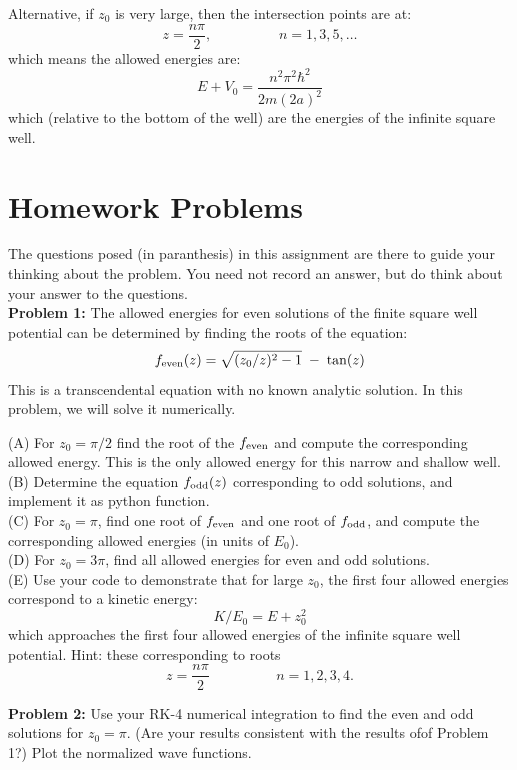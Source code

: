\documentclass[12pt]{article}
\begin{document}
Alternative, if $z_0$ is very large, then the intersection points are at:
$$z = \frac{n\pi}{2}, \hspace{2cm} n=1,3,5,\ldots$$
which means the allowed energies are:
$$E + V_0 = \frac{n^2\pi^2\hbar^2}{2m(2a)^2}$$
which (relative to the bottom of the well) are the energies of the infinite square well.

\newpage
\section{Homework Problems}

The questions posed (in paranthesis) in this assignment are there to guide your thinking about the problem.  You need not record an answer, but do think about your answer to the questions.\\[5pt]

\noindent
{\bf Problem 1:}  The allowed energies for even solutions of the finite square well potential can be determined by finding the roots of the equation:
$$f_{\rm even}(z) = \sqrt{(z_0/z)^2-1} \; - \; \tan(z)$$
This is a transcendental equation with no known analytic solution.  In this problem, we will solve it numerically.

\noindent
(A) For $z_0 = \pi/2$ find the root of the $f_{\rm even}$ and compute the corresponding allowed energy.  This is the only allowed energy for this narrow and shallow well.\\[5pt]

\noindent
(B) Determine the equation $f_{\rm odd}(z)$ corresponding to odd solutions, and implement it as python function.\\[5pt]

\noindent
(C) For $z_0 = \pi$, find one root of $f_{\rm even}$ and one root of $f_{\rm odd}$, and compute the corresponding allowed energies (in units of $E_0$).\\[5pt]

\noindent
(D) For $z_0 = 3\pi$, find all allowed energies for even and odd solutions.\\[5pt]

\noindent
(E) Use your code to demonstrate that for large $z_0$, the first four allowed energies correspond to a kinetic energy:
$$K/E_0 = E + z_0^2$$
which approaches the first four allowed energies of the infinite square well potential.  Hint:  these corresponding to roots
$$z = \frac{n \pi}{2} \hspace{2cm} n=1,2,3,4.$$

\noindent
    {\bf Problem 2:} Use your RK-4 numerical integration to find the even and odd solutions for $z_0 = \pi$.  (Are your results consistent with the results ofof Problem 1?)  Plot the normalized wave functions.\\[5pt]
\end{document}
